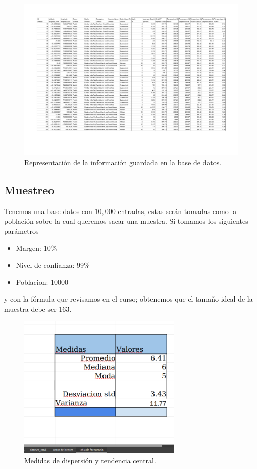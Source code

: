 \documentclass[12pt]{article}
\begin{document}
	\begin{figure}[h]
	\centering
		\includegraphics[height=0.6\textheight]{dataset_coral.png}
	\caption{Representación de la información guardada en la base de datos.}
	\label{fig: tabla}
\end{figure}

	
\newpage
\subsection{Muestreo}

	\par Tenemos una base datos con $10,000$ entradas, estas serán tomadas como la población sobre la cual queremos sacar una muestra. Si tomamos los siguientes parámetros
	\begin{itemize}
		\item Margen: 10\%
		\item Nivel de confianza: 99\%
		\item Poblacion: 10000
	\end{itemize}
	
	\noindent y con la fórmula que revisamos en el curso; obtenemos que el tamaño ideal de la muestra debe ser 163.

	
	\begin{figure}[h]
	\centering
		\includegraphics[width=0.7\textwidth]{medidas-EA-U3.png}
	\caption{Medidas de dispersión y tendencia central.}
	\label{fig: tabla frecuencia}
\end{figure}
\end{document}
